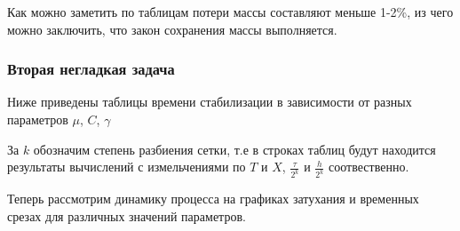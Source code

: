 Как можно заметить по таблицам потери массы составляют меньше 1-2\%, из чего можно заключить, что закон сохранения массы выполняется. \\

\newpage
\subsubsection{Вторая негладкая задача}
Ниже приведены таблицы времени стабилизации в зависимости от разных параметров $\mu$, $C$, $\gamma$

За $k$ обозначим степень разбиения сетки, т.е в строках таблиц будут находится результаты вычислений с измельчениями по $T$ и $X$, $\frac{\tau}{2^k}$ и $\frac{h}{2^k}$ соотвественно.





\newpage




\newpage
Теперь рассмотрим динамику процесса на графиках затухания и временных срезах для различных значений параметров. 


